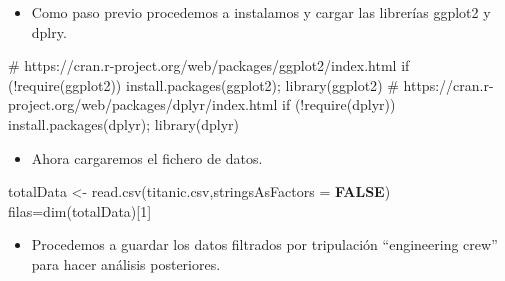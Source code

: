 \documentclass[
]{article}
\newenvironment{Shaded}{\begin{snugshade}}{\end{snugshade}}
\newcommand{\AttributeTok}[1]{\textcolor[rgb]{0.80,0.80,0.80}{#1}}
\newcommand{\CommentTok}[1]{\textcolor[rgb]{0.50,0.62,0.50}{#1}}
\newcommand{\ConstantTok}[1]{\textcolor[rgb]{0.86,0.64,0.64}{\textbf{#1}}}
\newcommand{\ControlFlowTok}[1]{\textcolor[rgb]{0.94,0.87,0.69}{#1}}
\newcommand{\DecValTok}[1]{\textcolor[rgb]{0.86,0.86,0.80}{#1}}
\newcommand{\FunctionTok}[1]{\textcolor[rgb]{0.94,0.94,0.56}{#1}}
\newcommand{\NormalTok}[1]{\textcolor[rgb]{0.80,0.80,0.80}{#1}}
\newcommand{\OtherTok}[1]{\textcolor[rgb]{0.94,0.94,0.56}{#1}}
\newcommand{\SpecialCharTok}[1]{\textcolor[rgb]{0.86,0.64,0.64}{#1}}
\newcommand{\StringTok}[1]{\textcolor[rgb]{0.80,0.58,0.58}{#1}}
\providecommand{\tightlist}{%
  \setlength{\itemsep}{0pt}\setlength{\parskip}{0pt}}
\begin{document}
\begin{itemize}
\tightlist
\item
  Como paso previo procedemos a instalamos y cargar las librerías
  ggplot2 y dplry.
\end{itemize}

\begin{Shaded}
\begin{Highlighting}[]
\CommentTok{\# https://cran.r{-}project.org/web/packages/ggplot2/index.html}
\ControlFlowTok{if}\NormalTok{ (}\SpecialCharTok{!}\FunctionTok{require}\NormalTok{(}\StringTok{\textquotesingle{}ggplot2\textquotesingle{}}\NormalTok{)) }\FunctionTok{install.packages}\NormalTok{(}\StringTok{\textquotesingle{}ggplot2\textquotesingle{}}\NormalTok{); }\FunctionTok{library}\NormalTok{(}\StringTok{\textquotesingle{}ggplot2\textquotesingle{}}\NormalTok{)}
\CommentTok{\# https://cran.r{-}project.org/web/packages/dplyr/index.html}
\ControlFlowTok{if}\NormalTok{ (}\SpecialCharTok{!}\FunctionTok{require}\NormalTok{(}\StringTok{\textquotesingle{}dplyr\textquotesingle{}}\NormalTok{)) }\FunctionTok{install.packages}\NormalTok{(}\StringTok{\textquotesingle{}dplyr\textquotesingle{}}\NormalTok{); }\FunctionTok{library}\NormalTok{(}\StringTok{\textquotesingle{}dplyr\textquotesingle{}}\NormalTok{)}
\end{Highlighting}
\end{Shaded}

\begin{itemize}
\tightlist
\item
  Ahora cargaremos el fichero de datos.
\end{itemize}

\begin{Shaded}
\begin{Highlighting}[]
\NormalTok{totalData }\OtherTok{\textless{}{-}} \FunctionTok{read.csv}\NormalTok{(}\StringTok{\textquotesingle{}titanic.csv\textquotesingle{}}\NormalTok{,}\AttributeTok{stringsAsFactors =} \ConstantTok{FALSE}\NormalTok{)}
\NormalTok{filas}\OtherTok{=}\FunctionTok{dim}\NormalTok{(totalData)[}\DecValTok{1}\NormalTok{]}
\end{Highlighting}
\end{Shaded}

\begin{itemize}
\tightlist
\item
  Procedemos a guardar los datos filtrados por tripulación ``engineering
  crew'' para hacer análisis posteriores.
\end{itemize}
\end{document}
